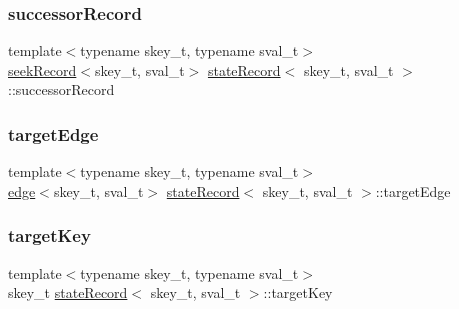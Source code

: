 \mbox{\label{structstateRecord_ae385a9aaf16313a210dccd7ce94d0e0a}} 
\subsubsection{\texorpdfstring{successor\+Record}{successorRecord}}
{\footnotesize\ttfamily template$<$typename skey\+\_\+t, typename sval\+\_\+t$>$ \\
\hyperlink{structseekRecord}{seek\+Record}$<$skey\+\_\+t, sval\+\_\+t$>$ \hyperlink{structstateRecord}{state\+Record}$<$ skey\+\_\+t, sval\+\_\+t $>$\+::successor\+Record}

\mbox{\label{structstateRecord_ad0f7bb1f0798b986c6d924be5fab7077}} 
\subsubsection{\texorpdfstring{target\+Edge}{targetEdge}}
{\footnotesize\ttfamily template$<$typename skey\+\_\+t, typename sval\+\_\+t$>$ \\
\hyperlink{structedge}{edge}$<$skey\+\_\+t, sval\+\_\+t$>$ \hyperlink{structstateRecord}{state\+Record}$<$ skey\+\_\+t, sval\+\_\+t $>$\+::target\+Edge}

\mbox{\label{structstateRecord_acaced3e9c482c829b679cfd8cb9ff07f}} 
\subsubsection{\texorpdfstring{target\+Key}{targetKey}}
{\footnotesize\ttfamily template$<$typename skey\+\_\+t, typename sval\+\_\+t$>$ \\
skey\+\_\+t \hyperlink{structstateRecord}{state\+Record}$<$ skey\+\_\+t, sval\+\_\+t $>$\+::target\+Key}

\mbox{\label{structstateRecord_a4ec229c5b99079c2103da81220452739}} 
